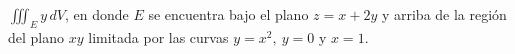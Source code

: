 \item $\iiint_E y \, dV$, en donde $E$ se encuentra bajo el plano $z = x + 2y$ y arriba de la región del plano $xy$ limitada por las curvas $y = x^2, \ y = 0$ y $x = 1$.
